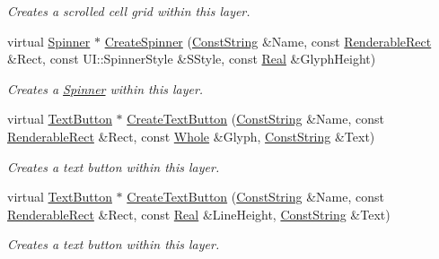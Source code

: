 \begin{DoxyCompactItemize}
\begin{DoxyCompactList}\small\item\em Creates a scrolled cell grid within this layer. \item\end{DoxyCompactList}\item 
virtual \hyperlink{classphys_1_1UI_1_1Spinner}{Spinner} $\ast$ \hyperlink{classphys_1_1UI_1_1Layer_aaa21b066649965bec3b992b92fe0eeb7}{CreateSpinner} (\hyperlink{namespacephys_a5ce5049f8b4bf88d6413c47b504ebb31}{ConstString} \&Name, const \hyperlink{structphys_1_1UI_1_1RenderableRect}{RenderableRect} \&Rect, const UI::SpinnerStyle \&SStyle, const \hyperlink{namespacephys_af7eb897198d265b8e868f45240230d5f}{Real} \&GlyphHeight)
\begin{DoxyCompactList}\small\item\em Creates a \hyperlink{classphys_1_1UI_1_1Spinner}{Spinner} within this layer. \item\end{DoxyCompactList}\item 
virtual \hyperlink{classphys_1_1UI_1_1TextButton}{TextButton} $\ast$ \hyperlink{classphys_1_1UI_1_1Layer_a4a6246485351ecc9db995c749dc18f13}{CreateTextButton} (\hyperlink{namespacephys_a5ce5049f8b4bf88d6413c47b504ebb31}{ConstString} \&Name, const \hyperlink{structphys_1_1UI_1_1RenderableRect}{RenderableRect} \&Rect, const \hyperlink{namespacephys_a460f6bc24c8dd347b05e0366ae34f34a}{Whole} \&Glyph, \hyperlink{namespacephys_a5ce5049f8b4bf88d6413c47b504ebb31}{ConstString} \&Text)
\begin{DoxyCompactList}\small\item\em Creates a text button within this layer. \item\end{DoxyCompactList}\item 
virtual \hyperlink{classphys_1_1UI_1_1TextButton}{TextButton} $\ast$ \hyperlink{classphys_1_1UI_1_1Layer_ad2c0cfc59e34aeda647a7659b4522e55}{CreateTextButton} (\hyperlink{namespacephys_a5ce5049f8b4bf88d6413c47b504ebb31}{ConstString} \&Name, const \hyperlink{structphys_1_1UI_1_1RenderableRect}{RenderableRect} \&Rect, const \hyperlink{namespacephys_af7eb897198d265b8e868f45240230d5f}{Real} \&LineHeight, \hyperlink{namespacephys_a5ce5049f8b4bf88d6413c47b504ebb31}{ConstString} \&Text)
\begin{DoxyCompactList}\small\item\em Creates a text button within this layer. \item\end{DoxyCompactList}\item 

\end{DoxyCompactItemize}
